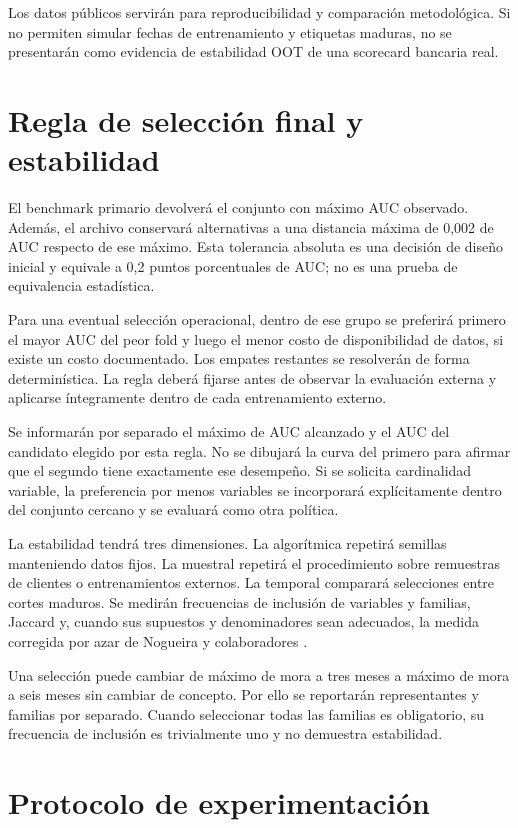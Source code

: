 \documentclass[11pt,letterpaper]{article}
\begin{document}
Los datos públicos servirán para reproducibilidad y comparación metodológica. Si no permiten simular fechas de entrenamiento y etiquetas maduras, no se presentarán como evidencia de estabilidad OOT de una scorecard bancaria real.

\section{Regla de selección final y estabilidad}\label{sec:9}

El benchmark primario devolverá el conjunto con máximo AUC observado. Además, el archivo conservará alternativas a una distancia máxima de 0,002 de AUC respecto de ese máximo. Esta tolerancia absoluta es una decisión de diseño inicial y equivale a 0,2 puntos porcentuales de AUC; no es una prueba de equivalencia estadística.

Para una eventual selección operacional, dentro de ese grupo se preferirá primero el mayor AUC del peor fold y luego el menor costo de disponibilidad de datos, si existe un costo documentado. Los empates restantes se resolverán de forma determinística. La regla deberá fijarse antes de observar la evaluación externa y aplicarse íntegramente dentro de cada entrenamiento externo.

Se informarán por separado el máximo de AUC alcanzado y el AUC del candidato elegido por esta regla. No se dibujará la curva del primero para afirmar que el segundo tiene exactamente ese desempeño. Si se solicita cardinalidad variable, la preferencia por menos variables se incorporará explícitamente dentro del conjunto cercano y se evaluará como otra política.

La estabilidad tendrá tres dimensiones. La algorítmica repetirá semillas manteniendo datos fijos. La muestral repetirá el procedimiento sobre remuestras de clientes o entrenamientos externos. La temporal comparará selecciones entre cortes maduros. Se medirán frecuencias de inclusión de variables y familias, Jaccard y, cuando sus supuestos y denominadores sean adecuados, la medida corregida por azar de Nogueira y colaboradores \cite{ref7}.

Una selección puede cambiar de máximo de mora a tres meses a máximo de mora a seis meses sin cambiar de concepto. Por ello se reportarán representantes y familias por separado. Cuando seleccionar todas las familias es obligatorio, su frecuencia de inclusión es trivialmente uno y no demuestra estabilidad.

\section{Protocolo de experimentación}\label{sec:10}
\end{document}
